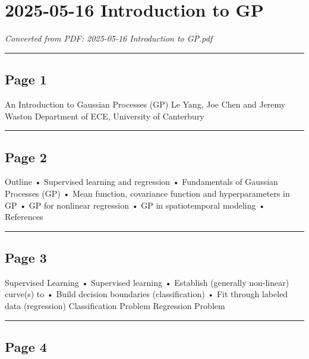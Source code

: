 \documentclass[
]{article}
\author{}
\date{}
\begin{document}
\section{2025-05-16 Introduction to GP}\label{introduction-to-gp}

\emph{Converted from PDF: 2025-05-16 Introduction to GP.pdf}

\begin{center}\rule{0.5\linewidth}{0.5pt}\end{center}

\subsection{Page 1}\label{page-1}

An Introduction to Gaussian Processes (GP) Le Yang, Joe Chen and Jeremy
Waston Department of ECE, University of Canterbury

\begin{center}\rule{0.5\linewidth}{0.5pt}\end{center}

\subsection{Page 2}\label{page-2}

Outline • Supervised learning and regression • Fundamentals of Gaussian
Processes (GP) • Mean function, covariance function and hyperparameters
in GP • GP for nonlinear regression • GP in spatiotemporal modeling •
References

\begin{center}\rule{0.5\linewidth}{0.5pt}\end{center}

\subsection{Page 3}\label{page-3}

Supervised Learning • Supervised learning • Establish (generally
non-linear) curve(s) to • Build decision boundaries (classification) •
Fit through labeled data (regression) Classification Problem Regression
Problem

\begin{center}\rule{0.5\linewidth}{0.5pt}\end{center}

\subsection{Page 4}\label{page-4}
\end{document}
